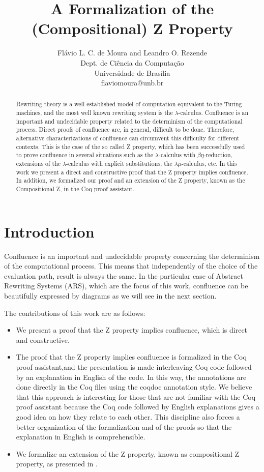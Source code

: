 \documentclass[a4paper]{article}
\title{A Formalization of the (Compositional) Z Property}
\author{
Flávio L. C. de Moura and Leandro O. Rezende\\ Dept. de Ciência da Computação\\
                Universidade de Brasília \\ flaviomoura@unb.br
}
\newcommand{\flavio}[1]{{\color{red}#1}}
\begin{document}
\maketitle

\begin{abstract}
  Rewriting theory is a well established model of computation
  equivalent to the Turing machines, and the most well known rewriting
  system is the $\lambda$-calculus. Confluence is an important and
  undecidable property related to the determinism of the computational
  process. Direct proofs of confluence are, in general, difficult to
  be done. Therefore, alternative characterizations of confluence can
  circumvent this difficulty for different contexts. This is the case
  of the so called Z property, which has been successfully used to
  prove confluence in several situations such as the
  $\lambda$-calculus with $\beta\eta$-reduction, extensions of the
  $\lambda$-calculus with explicit substitutions, the
  $\lambda\mu$-calculus, etc. In this work we present a direct and
  constructive proof that the Z property implies confluence.  In
  addition, we formalized our proof and an extension of the Z
  property, known as the Compositional Z, in the Coq proof assistant.
\end{abstract}
\vskip 32pt


\section{Introduction}

Confluence is an important and undecidable property concerning the
determinism of the computational process. This means that
independently of the choice of the evaluation path, result is always
the same. In the particular case of Abstract Rewriting Systems (ARS),
which are the focus of this work, confluence can be beautifully
expressed by diagrams as we will see in the next section.

The contributions of this work are as follows:
\begin{itemize}
\item We present a proof that the Z property implies confluence,
  which is direct and constructive.
\item The proof that the Z property implies confluence is formalized
  in the Coq proof assistant,\flavio{and the presentation is made
  interleaving Coq code followed by an explanation in English of the
  code. In this way, the annotations are done directly in the Coq
  files using the coqdoc annotation style. We believe that this
  approach is interesting for those that are not familiar with the Coq
  proof assistant because the Coq code followed by English
  explanations gives a good idea on how they relate to each
  other. This discipline also forces a better organization of the
  formalization and of the proofs so that the explanation in English
  is comprehensible.}
\item We formalize an extension of the Z property, known as
  compositional Z property, as presented in
  \cite{Nakazawa-Fujita2016}.
\end{itemize}
\end{document}
